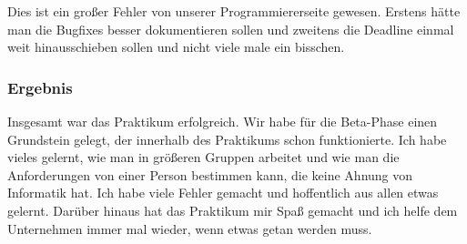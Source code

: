 Dies ist ein großer Fehler von unserer Programmiererseite gewesen. Erstens hätte man die Bugfixes besser dokumentieren sollen und zweitens die Deadline einmal weit hinausschieben sollen und nicht viele male ein bisschen.\\

\subsubsection{Ergebnis}

Insgesamt war das Praktikum erfolgreich. Wir habe für die Beta-Phase einen Grundstein gelegt, der innerhalb des Praktikums schon funktionierte. Ich habe vieles gelernt, wie man in größeren Gruppen arbeitet und wie man die Anforderungen von einer Person bestimmen kann, die keine Ahnung von Informatik hat. Ich habe viele Fehler gemacht und hoffentlich aus allen etwas gelernt. Darüber hinaus hat das Praktikum mir Spaß gemacht und ich helfe dem Unternehmen immer mal wieder, wenn etwas getan werden muss.
